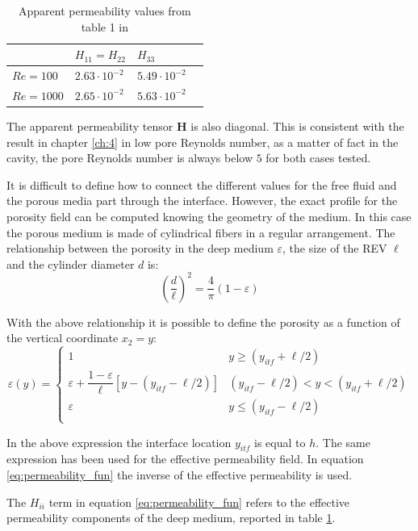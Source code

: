\begin{table}[b!]
	\centering
	\begin{tabular}{ l | l |  l   l   }
		& $H_{11} = H_{22}$ & $H_{33}$ \\ 
		\hline
		\hline
		$Re=100$ & $2.63 \cdot 10^{-2}$ & $5.49 \cdot 10^{-2}$ \\ 
		$Re=1000$ & $2.65 \cdot 10^{-2}$ & $5.63 \cdot 10^{-2}$
	\end{tabular}
	\caption{Apparent permeability values from table 1 in \citet{zampogna2016fluid}}
	\label{tab:H}
\end{table}

\newpage

The apparent permeability tensor $\mathbf{H}$ is also diagonal. This is consistent with the result in chapter \ref{ch:4} in low pore Reynolds number, as a matter of fact in the cavity, the pore Reynolds number is always below $5$ for both cases tested.

It is difficult to define how to connect the different values for the free fluid and the porous media part through the interface.
However, the exact profile for the porosity field can be computed knowing the geometry of the medium. In this case the porous medium is made of cylindrical fibers in a regular arrangement. The relationship between the porosity in the deep medium $\varepsilon$, the size of the REV $\ell$ and the cylinder diameter $d$ is:
$$
\left( \dfrac{d}{\ell} \right)^2 = \dfrac{4}{\pi} \left(1 - \varepsilon \right)
$$

With the above relationship it is possible to define the porosity as a function of the vertical coordinate $x_2 = y$:
\begin{equation}
\varepsilon(y) = 
\begin{cases}
1 & y\geqslant(y_{itf}+\ell/2) \\
\varepsilon +\dfrac{1-\varepsilon}{\ell}\left[y -\left(y_{itf} -\ell/2\right)\right] &  (y_{itf}-\ell/2)<y<(y_{itf}+\ell/2)\\
\varepsilon &y\leqslant(y_{itf}-\ell/2) \\
\end{cases}
\label{eq:porsitity_fun}
\end{equation}

In the above expression the interface location $y_{itf}$ is equal to $h$. The same expression has been used for the effective permeability field. In equation \eqref{eq:permeability_fun} the inverse of the effective permeability is used.

The ${H_{ii}}$ term in equation \eqref{eq:permeability_fun} refers to the effective permeability components of the deep medium, reported in table \ref{tab:H}.

